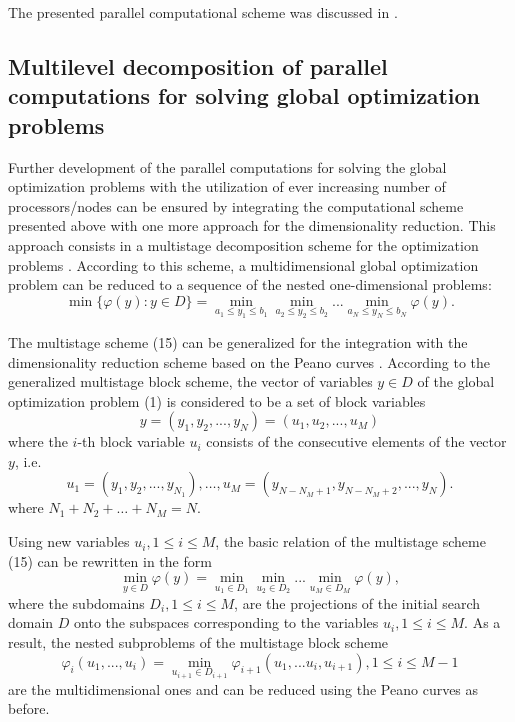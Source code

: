 \documentclass[12pt]{amsart}
\begin{document}
The presented parallel computational scheme was discussed in \cite{Strongin1, Strongin2, Strongin5, Gergel1}.


\subsection{Multilevel decomposition of parallel computations for solving global optimization problems}

Further development of the parallel computations for solving the global optimization problems with the utilization of ever increasing number of processors/nodes can be ensured by integrating the computational scheme presented above with one more approach for the dimensionality reduction. This approach consists in a multistage decomposition scheme for the optimization problems \cite{Strongin2, Sergeyev4, Gergel5}. According to this scheme, a multidimensional global optimization problem can be reduced to a sequence of the nested one-dimensional problems:
\begin{equation}
\min \lbrace \varphi(y): y \in D \rbrace = \min_{a_1 \leq y_1 \leq b_1} \min_{a_2 \leq y_2 \leq b_2} ... \min_{a_N \leq y_N \leq b_N} \varphi(y).
\end{equation}

The multistage scheme (15) can be generalized for the integration with the dimensionality reduction scheme based on the Peano curves \cite{Sysoyev}. According to the generalized multistage block scheme, the vector of variables $y \in D$ of the global optimization problem (1) is considered to be a set of block variables
\[
y = (y_1, y_2, ..., y_N) = (u_1, u_2, ..., u_M)
\]
where the $i$-th block variable $u_i$ consists of the consecutive elements of the vector $y$, i.e.
\[
u_1 = (y_1, y_2, ..., y_{N_1}), \dots, 
u_M = (y_{N-N_M+1}, y_{N-N_M+2}, ..., y_N).
\]
where $N_1 + N_2 + \dots + N_M = N$.

Using new variables $u_i, 1 \leq i \leq M$, the basic relation of the multistage scheme (15) can be rewritten in the form
\begin{equation}
\min_{y \in D} \varphi(y) = \min_{u_1 \in D_1} \min_{u_2 \in D_2} ... \min_{u_M \in D_M} \varphi(y),
\end{equation}
where the subdomains $D_i, 1 \leq i \leq M$, are the projections of the initial search domain $D$ onto the subspaces corresponding to the variables $u_i,1 \leq i \leq M$. As a result, the nested subproblems of the multistage block scheme
\begin{equation}
\varphi_i(u_1,...,u_i) = \min_{u_{i+1} \in D_{i+1}} \varphi_{i+1}(u_1,...u_i,u_{i+1}), 1 \leq i \leq M - 1
\end{equation}
are the multidimensional ones and can be reduced using the Peano curves as before.
\end{document}
